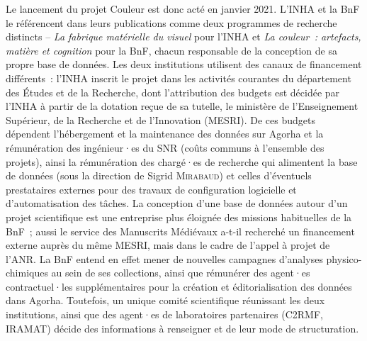 \documentclass[a4paper,12pt, twoside]{book}
\begin{document}
Le lancement du projet Couleur est donc acté en janvier 2021. L’INHA et la BnF le référencent dans leurs publications comme deux programmes de recherche distincts – \textit{La fabrique matérielle du visuel} pour l’INHA et \textit{La couleur~: artefacts, matière et cognition} pour la BnF, chacun responsable de la conception de sa propre base de données. Les deux institutions utilisent des canaux de financement différents~: l’INHA inscrit le projet dans les activités courantes du département des Études et de la Recherche, dont l’attribution des budgets est décidée par l’INHA à partir de la dotation reçue de sa tutelle, le ministère de l’Enseignement Supérieur, de la Recherche et de l’Innovation (MESRI). De ces budgets dépendent l’hébergement et la maintenance des données sur Agorha et la rémunération des ingénieur·es du SNR (coûts communs à l’ensemble des projets), ainsi la rémunération des chargé·es de recherche qui alimentent la base de données (sous la direction de Sigrid \textsc{Mirabaud}) et celles d’éventuels prestataires externes pour des travaux de configuration logicielle et d’automatisation des tâches. La conception d’une base de données autour d’un projet scientifique est une entreprise plus éloignée des missions habituelles de la BnF~; aussi le service des Manuscrits Médiévaux a-t-il recherché un financement externe auprès du même MESRI, mais dans le cadre de l’appel à projet de l’ANR. La BnF entend en effet mener de nouvelles campagnes d’analyses physico-chimiques au sein de ses collections, ainsi que rémunérer des agent·es contractuel·les supplémentaires pour la création et éditorialisation des données dans Agorha. Toutefois, un unique comité scientifique réunissant les deux institutions, ainsi que des agent·es de laboratoires partenaires (C2RMF, IRAMAT) décide des informations à renseigner et de leur mode de structuration.
\end{document}
